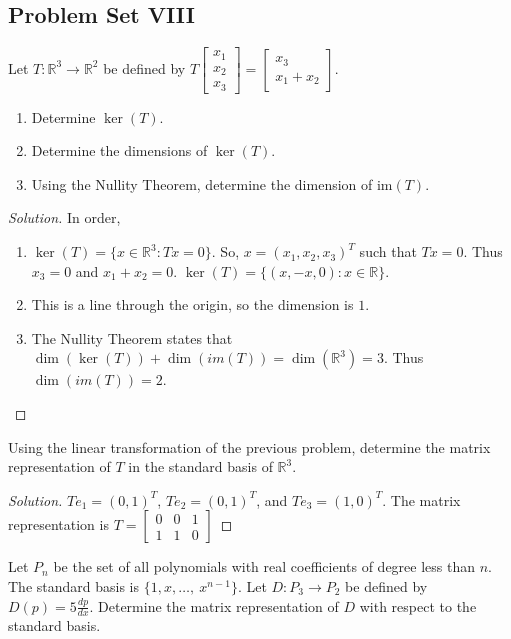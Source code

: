 \documentclass[../main.tex]{subfiles}
\begin{document}
\subsection{Problem Set VIII}
%
\begin{problem}
Let $T:\mathbb{R}^3\rightarrow \mathbb{R}^2$ be defined by $T\begin{bmatrix} x_1 \\ x_2 \\ x_3 \end{bmatrix} = \begin{bmatrix} x_3 \\ x_1+x_2 \end{bmatrix}$.
\begin{enumerate}
\item Determine $\ker(T)$.
\item Determine the dimensions of $\ker(T)$.
\item Using the Nullity Theorem, determine the dimension of im$(T)$.
\end{enumerate}
\end{problem}
\begin{proof}[Solution]
In order,
\begin{enumerate}
\item $\ker(T)= \{x\in \mathbb{R}^3: Tx = 0\}$. So, $x = (x_1,x_2,x_3)^T$ such that $Tx = 0$. Thus $x_3 = 0$ and $x_1+x_2 = 0$. $\ker(T) = \{(x,-x,0):x\in \mathbb{R}\}$.
\item This is a line through the origin, so the dimension is $1$. 
\item The Nullity Theorem states that $\dim(\ker(T))+\dim(im(T)) = \dim(\mathbb{R}^3) = 3$. Thus $\dim(im(T)) = 2$.
\end{enumerate}
\end{proof}
%
\begin{problem}
Using the linear transformation of the previous problem, determine the matrix representation of $T$ in the standard basis of $\mathbb{R}^3$.
\end{problem}
\begin{proof}[Solution]
$Te_1 = (0,1)^T$, $T e_2 = (0,1)^T$, and $Te_3 = (1,0)^T$. The matrix representation is $T=\begin{bmatrix} 0 & 0 & 1 \\ 1 & 1 & 0 \end{bmatrix}$
\end{proof}
%
\begin{problem}
Let $P_n$ be the set of all polynomials with real coefficients of degree less than $n$. The standard basis is $\{1,x,\hdots, \ x^{n-1}\}$. Let $D:P_3 \rightarrow P_2$ be defined by $D(p) = 5\frac{dp}{dx}$. Determine the matrix representation of $D$ with respect to the standard basis.
\end{problem}
\end{document}
